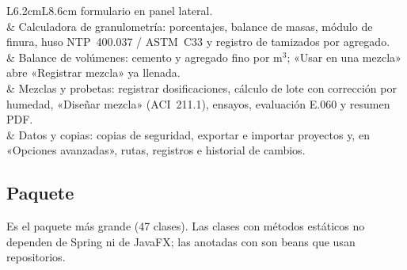 \begin{longtable}{L{6.2cm}L{8.6cm}}
	formulario en panel lateral. \\
	 & Calculadora de granulometría: porcentajes, balance de masas, módulo de finura,
	huso NTP~400.037 / ASTM~C33 y registro de tamizados por agregado. \\
	 & Balance de volúmenes: cemento y agregado fino por m$^3$; «Usar en una mezcla» abre
	«Registrar mezcla» ya llenada. \\
	 & Mezclas y probetas: registrar dosificaciones, cálculo de lote con corrección por
	humedad, «Diseñar mezcla» (ACI~211.1), ensayos, evaluación E.060 y resumen PDF. \\
	 & Datos y copias: copias de seguridad, exportar e importar proyectos y, en «Opciones
	avanzadas», rutas, registros e historial de cambios. \\
\end{longtable}

\subsection{Paquete }

Es el paquete más grande (47 clases). Las clases  con métodos estáticos no dependen de Spring ni de JavaFX;
las anotadas con  son beans que usan repositorios.

